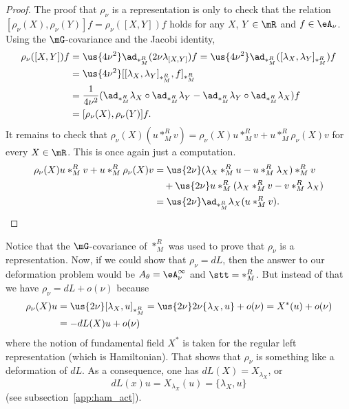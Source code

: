 \begin{proof}
	The proof  that $\rho_{\nu}$ is a representation is only to check that the relation $[\rho_{\nu}(X),\rho_{\nu}(Y)]f=\rho_{\nu}([X,Y])f$ holds for any $X$, $Y\in\mR$ and $f\in\eA_{\nu}$. Using the $\mG$-covariance and the Jacobi identity,
	\begin{equation}
		\begin{split}
			\rho_{\nu}([X,Y])f&=\us{4\nu^2}\ad_{\ast_M^R}(2\nu\lambda_{[X,Y]})f
			=\us{4\nu^2}\ad_{\ast_M^R}([\lambda_X,\lambda_Y]_{\ast_M^R})f\\
			&=\us{4\nu^2}[[\lambda_X,\lambda_Y]_{\ast_M^R},f]_{\ast_M^R}\\
			&=\frac{1}{ 4\nu^2 }(\ad_{\ast_M^R}\lambda_X\circ\ad_{\ast_M^R}\lambda_Y-\ad_{\ast_M^R}\lambda_Y\circ\ad_{\ast_M^R}\lambda_X)f\\
			&=[\rho_{\nu}(X),\rho_{\nu}(Y)]f.
		\end{split}
	\end{equation}
	It remains to check that $\rho_{\nu}(X)(u\ast_M^R v)=\rho_{\nu}(X)u\ast_M^R v+u\ast_M^R\rho_{\nu}(X)v$ for every $X\in\mR$. This is once again just a computation.
	\begin{equation}
		\begin{split}
			\rho_{\nu}(X)u\ast_M^R v+u\ast_M^R\rho_{\nu}(X)v&=\us{2\nu}(\lambda_X\ast_M^R u-u\ast_M^R\lambda_X)\ast_M^R v\\
			&\quad+\us{2\nu}u\ast_M^R(\lambda_X\ast_M^R v-v\ast_M^R\lambda_X)\\
			&=\us{2\nu}\ad_{\ast_M^R}\lambda_X(u\ast_M^R v).
		\end{split}
	\end{equation}
\end{proof}
Notice that the $\mG$-covariance of $\ast_M^R$ was used to prove that $\rho_{\nu}$ is a representation.  Now, if we could show that $\rho_{\nu}=dL$, then the answer to our deformation problem would be $A_{\theta}=\eA^{\infty}_{\nu}$ and $\stt=\ast_M^R$. But instead of that we have $\rho_{\nu}=dL+o(\nu)$ because
\begin{equation}
	\begin{split}
		\rho_{\nu}(X)u&=\us{2\nu}[\lambda_X,u]_{\ast_M^R}
		=\us{2\nu} 2\nu\{\lambda_X,u\}+o(\nu)
		=X^*(u)+o(\nu)\\
		&=-dL(X)u+o(\nu)
	\end{split}
\end{equation}
where the notion of fundamental field $X^*$ is taken for the regular left representation (which is Hamiltonian). That shows that $\rho_{\nu}$ is something like a deformation of $dL$. As a consequence, one has $dL(X)=X_{\lambda_X}$, or
\begin{equation}\label{eq:dL_et_Poisson}
	dL(x)u=X_{\lambda_X}(u)=\{\lambda_X,u\}
\end{equation}
(see subsection~\ref{app:ham_act}).

